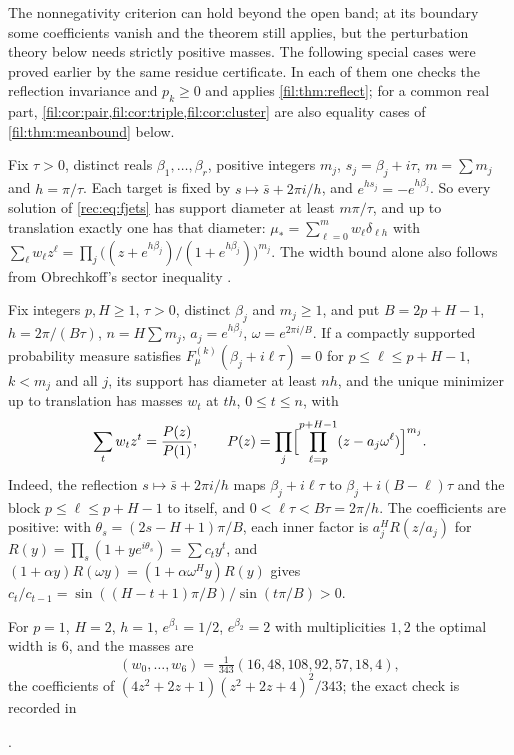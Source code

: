 The nonnegativity criterion can hold beyond the open band; at its boundary some coefficients
vanish and the theorem still applies, but the perturbation theory below needs strictly positive
masses. The following special cases were proved earlier by the same residue certificate. In each
of them one checks the reflection invariance and $p_k\ge0$ and applies \cref{fil:thm:reflect}; for a
common real part, \cref{fil:cor:pair,fil:cor:triple,fil:cor:cluster} are also equality cases of
\cref{fil:thm:meanbound} below.

\begin{example}\label{rec:thm:fwidth}
Fix $\tau>0$, distinct reals $\beta_1,\dots,\beta_r$, positive integers $m_j$, $s_j=\beta_j+i\tau$,
$m=\sum m_j$ and $h=\pi/\tau$. Each target is fixed by $s\mapsto\bar s+2\pi i/h$, and
$e^{hs_j}=-e^{h\beta_j}$. So every solution of \eqref{rec:eq:fjets} has support diameter at least
$m\pi/\tau$, and up to translation exactly one has that diameter:
$\mu_*=\sum_{\ell=0}^mw_\ell\delta_{\ell h}$ with
$\sum_\ell w_\ell z^\ell=\prod_j\bigl((z+e^{h\beta_j})/(1+e^{h\beta_j})\bigr)^{m_j}$. The width bound alone
also follows from Obrechkoff's sector inequality \cite{EremenkoFryntov2016Remarks}.
\end{example}

\begin{example}\label{rec:thm:hblock}
Fix integers $p,H\ge1$, $\tau>0$, distinct $\beta_j$ and $m_j\ge1$, and put $B=2p+H-1$,
$h=2\pi/(B\tau)$, $n=H\sum m_j$, $a_j=e^{h\beta_j}$, $\omega=e^{2\pi i/B}$. If a compactly supported
probability measure satisfies $F_\mu^{(k)}(\beta_j+i\ell\tau)=0$ for $p\le\ell\le p+H-1$, $k<m_j$ and all
$j$, its support has diameter at least $nh$, and the unique minimizer up to translation has masses
$w_t$ at $th$, $0\le t\le n$, with
\[
 \sum_tw_tz^t=\frac{P(z)}{P(1)},\qquad P(z)=\prod_j\Bigl[\prod_{\ell=p}^{p+H-1}(z-a_j\omega^\ell)\Bigr]^{m_j}.
\]
Indeed, the reflection $s\mapsto\bar s+2\pi i/h$ maps $\beta_j+i\ell\tau$ to $\beta_j+i(B-\ell)\tau$ and the
block $p\le\ell\le p+H-1$ to itself, and $0<\ell\tau<B\tau=2\pi/h$. The coefficients are positive:
with $\theta_s=(2s-H+1)\pi/B$, each inner factor is $a_j^HR(z/a_j)$ for
$R(y)=\prod_s(1+ye^{i\theta_s})=\sum c_ty^t$, and $(1+\alpha y)R(\omega y)=(1+\alpha\omega^Hy)R(y)$ gives
$c_t/c_{t-1}=\sin((H-t+1)\pi/B)/\sin(t\pi/B)>0$.

For $p=1$, $H=2$, $h=1$, $e^{\beta_1}=1/2$, $e^{\beta_2}=2$ with multiplicities $1,2$ the optimal width
is $6$, and the masses are
\[
 (w_0,\dots,w_6)=\tfrac1{343}(16,48,108,92,57,18,4),
\]
the coefficients of $(4z^2+2z+1)(z^2+2z+4)^2/343$; the exact check is recorded in
\begin{center}.\end{center}
\end{example}


